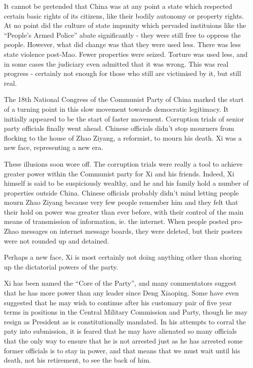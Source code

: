 \documentclass[10pt,a4paper,twocolumn]{article}
\begin{document}
It cannot be pretended that China was at any point a state which respected certain basic rights of its citizens, like their bodily autonomy or property rights. At no point did the culture of state impunity which pervaded instituions like the ``People's Armed Police'' abate significantly - they were still free to oppress the people. However, what did change was that they were used less. There was less state violence post-Mao. Fewer properties were seized. Torture was used less, and in some cases the judiciary even admitted that it was wrong. This was real progress - certainly not enough for those who still are victimised by it, but still real.

The 18th National Congress of the Communist Party of China marked the start of a turning point in this slow movement towards democratic legitimacy. It initially appeared to be the start of faster movement. Corruption trials of senior party officials finally went ahead. Chinese officials didn't stop mourners from flocking to the house of Zhao Ziyang, a reformist, to mourn his death. Xi was a new face, representing a new era.

These illusions soon wore off. The corruption trials were really a tool to achieve greater power within the Communist party for Xi and his friends. Indeed, Xi himself is said to be suspiciously wealthy, and he and his family hold a number of properties outside China. Chinese officials probably didn't mind letting people mourn Zhao Ziyang because very few people remember him and they felt that their hold on power was greater than ever before, with their control of the main means of transmission of information, ie. the internet. When people posted pro-Zhao messages on internet message boards, they were deleted, but their posters were not rounded up and detained.

Perhaps a new face, Xi is most certainly not doing anything other than shoring up the dictatorial powers of the party.

Xi has been named the ``Core of the Party'', and many commentators suggest that he has more power than any leader since Deng Xiaoping. Some have even suggested that he may wish to continue after his customary pair of five year terms in positions in the Central Military Commission and Party, though he may resign as President as is constitutionally mandated. In his attempts to corral the paty into submission, it is feared that he may have alienated so many officials that the only way to ensure that he is not arrested just as he has arrested some former officials is to stay in power, and that means that we must wait until his death, not his retirement, to see the back of him.
\end{document}
